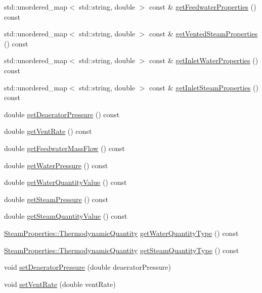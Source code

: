 \begin{DoxyCompactItemize}
std\+::unordered\+\_\+map$<$ std\+::string, double $>$ const  \& \hyperlink{class_deaerator_a74f7916b125f4964b0f534940f590633}{get\+Feedwater\+Properties} () const
\item 
std\+::unordered\+\_\+map$<$ std\+::string, double $>$ const  \& \hyperlink{class_deaerator_aba77ebc41e5b05d6e2463793bacbcbc0}{get\+Vented\+Steam\+Properties} () const
\item 
std\+::unordered\+\_\+map$<$ std\+::string, double $>$ const  \& \hyperlink{class_deaerator_a6dccf8495324c76a5d9b6128c57c0427}{get\+Inlet\+Water\+Properties} () const
\item 
std\+::unordered\+\_\+map$<$ std\+::string, double $>$ const  \& \hyperlink{class_deaerator_ae777da23f2504f8724850946378b3cf5}{get\+Inlet\+Steam\+Properties} () const
\item 
double \hyperlink{class_deaerator_ac16cacdeef74e45f951fe992bac4e9e3}{get\+Deaerator\+Pressure} () const
\item 
double \hyperlink{class_deaerator_ad0262491c2bd9a6f820eaaba54498bcd}{get\+Vent\+Rate} () const
\item 
double \hyperlink{class_deaerator_ae1524e8b406c3d5c2823ae4e6bafe389}{get\+Feedwater\+Mass\+Flow} () const
\item 
double \hyperlink{class_deaerator_ae86ef305a8641d61ec76bd39bb84f28b}{get\+Water\+Pressure} () const
\item 
double \hyperlink{class_deaerator_a9362430fb04802b6f14c9bf09d62a466}{get\+Water\+Quantity\+Value} () const
\item 
double \hyperlink{class_deaerator_aebe779c63cace193d040f497e3b70728}{get\+Steam\+Pressure} () const
\item 
double \hyperlink{class_deaerator_a5473feedca64e7c44143d422ed3e2401}{get\+Steam\+Quantity\+Value} () const
\item 
\hyperlink{class_steam_properties_ae0294bedf7d178c2d8fb6aed0f62fbff}{Steam\+Properties\+::\+Thermodynamic\+Quantity} \hyperlink{class_deaerator_a414282f81906e09a28bc75cf51659ec2}{get\+Water\+Quantity\+Type} () const
\item 
\hyperlink{class_steam_properties_ae0294bedf7d178c2d8fb6aed0f62fbff}{Steam\+Properties\+::\+Thermodynamic\+Quantity} \hyperlink{class_deaerator_a18abbdc5ec78f71e1d2495b0c64c77ec}{get\+Steam\+Quantity\+Type} () const
\item 
void \hyperlink{class_deaerator_a5b20d3aba98b21928cce70b45e843ff3}{set\+Deaerator\+Pressure} (double deaerator\+Pressure)
\item 
void \hyperlink{class_deaerator_a11e71194f58763a57ec0f7d05a21782d}{set\+Vent\+Rate} (double vent\+Rate)

\end{DoxyCompactItemize}
